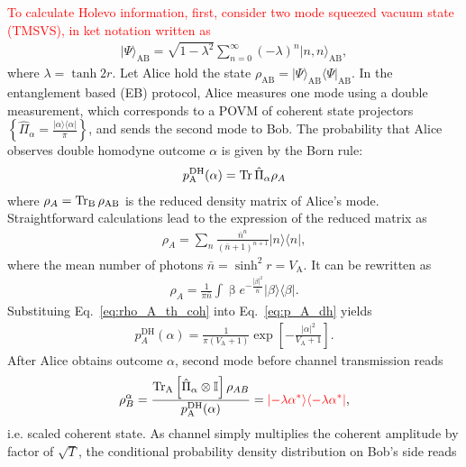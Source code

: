 \documentclass[%
reprint,
superscriptaddress,
 amsmath,amssymb,amsfonts,
 aps,
 pra,
 longbibliography
]{revtex4-2}
\newcommand{\ket}[1]{\ensuremath{|{#1}\rangle}}
\newcommand{\bra}[1]{\ensuremath{\langle{#1}|}}
\newcommand{\Tr}{\mathop{\rm Tr}\nolimits}
\newcommand{\ind}[1]{\mathrm{#1}}
\newcommand{\dd}{\mathrm{d}}
\begin{document}
\textcolor{red}{To calculate Holevo information, first, consider two mode squeezed vacuum state (TMSVS), in ket notation written as{~\cite{Weed:rmp:2012}}}
\begin{align}
  \label{eq:psi_AB}
  \ket{\Psi}_{\ind{AB}}=\sqrt{1-\lambda^2}\sum_{n=0}^{\infty}(-\lambda)^n\ket{n,n}_{\ind{AB}},
\end{align}
where $\lambda=\tanh 2r$. Let Alice hold the state $\rho_{\ind{AB}}=\ket{\Psi}_{\ind{AB}}\bra{\Psi}_{\ind{AB}}$. In the entanglement based (EB) protocol, Alice measures one mode using a double measurement, which corresponds to a POVM of coherent state projectors $\left\{\hat\Pi_\alpha=\frac{\ket{\alpha}\bra{\alpha}}\pi\right\}$, and sends the second mode to Bob. The probability that Alice observes double homodyne outcome $\alpha$ is given by the Born rule:
\begin{align}
  \label{eq:p_A_dh}
  p_{\ind{A}}^{\ind{DH}}(\alpha)=\Tr \hat{\Pi}_\alpha \rho_A
\end{align}
where $\rho_A=\Tr_{\ind{B}}\rho_{\ind{AB}}$ is the reduced density matrix of Alice's mode. Straightforward calculations lead to the expression of the reduced matrix as
\begin{align}
  \label{eq:rho_A_th}
  \rho_A=\sum_{n}\frac{\bar{n}^n}{(\bar{n}+1)^{n+1}}\ket{n}\bra{n},
\end{align}
where the mean number of photons $\bar{n}=\sinh^2 r = V_{\ind{A}}$. It can be rewritten as~\cite{Scully:bk:1997}
\begin{align}
  \label{eq:rho_A_th_coh}
  \rho_A=\frac{1}{\pi\bar{n}}\int \mathop{\dd^2\beta} e^{-\frac{|\beta|^2}{\bar{n}}}\ket{\beta}\bra{\beta}.
\end{align}
Substituing Eq.~\eqref{eq:rho_A_th_coh} into Eq.~\eqref{eq:p_A_dh} yields
\begin{align}
  \label{eq:p_A_dh_final}
  p_A^{\ind{DH}}(\alpha)=\frac{1}{\pi(V_{\ind{A}}+1)}\exp\left[
    -\frac{|\alpha|^2}{V_{\ind{A}}+1}
  \right].
\end{align}
After Alice obtains outcome $\alpha$, second mode before channel transmission reads
\begin{align}
  \label{eq:rhoBA}
  \rho_B^{\alpha}=\frac{\Tr_{\ind{A}}\left[\hat \Pi_\alpha \otimes \mathbb I\right]\rho_{AB}}{p_{\ind{A}}^{\ind{DH}}(\alpha)}=\textcolor{red}{\ket{-\lambda\alpha^*}\bra{-\lambda\alpha^*}},
\end{align}
i.e. scaled coherent state. 
As channel simply multiplies the coherent amplitude by factor of $\sqrt{T}$, the conditional probability density distribution on Bob's side reads
\end{document}

